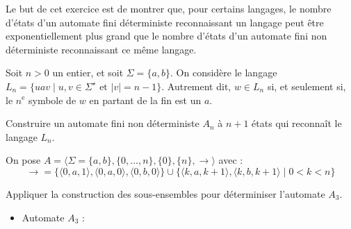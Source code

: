 
\begingroup

\begin{exercice}\label{exo:languages/automata/complexity}

  Le but de cet exercice est de montrer que, pour certains langages,
  le nombre d'états d'un automate fini déterministe reconnaissant un langage
  peut être exponentiellement plus grand que le nombre d'états
  d'un automate fini non déterministe reconnaissant ce même langage.

  Soit $n>0$ un entier, et soit $\Sigma = \{a, b\}$.
  On considère le langage $L_n = \{u a v \mid u, v \in \Sigma^\star \text{ et } |v| = n-1 \}$.
  Autrement dit, $w \in L_n$ si, et seulement si, le $n^{\text{e}}$ symbole de $w$ en partant de la fin est un $a$.
  
  \begin{questions}
  \item Construire un automate fini non déterministe $A_n$ à $n+1$ états qui reconnaît le langage $L_n$.
  \end{questions}
  \begin{corrections}
    On pose $A = \langle \Sigma = \{a, b\}, \{0, ..., n\}, \{0\}, \{n\}, \rightarrow \rangle$ avec :
    $$\rightarrow = \{\langle 0, a, 1\rangle, \langle 0, a, 0\rangle, \langle 0, b, 0\rangle\} \cup \{\langle k, a, k+1\rangle, \langle k, b, k+1\rangle \mid 0 < k < n \}$$ 
  \end{corrections}

  \begin{questions}
  \item Appliquer la construction des sous-ensembles pour déterminiser l'automate $A_3$. 
  \end{questions}
  \begin{corrections}
    \begin{itemize}
    \item Automate $A_3$ :
\end{itemize}
\end{corrections}
\end{exercice}
